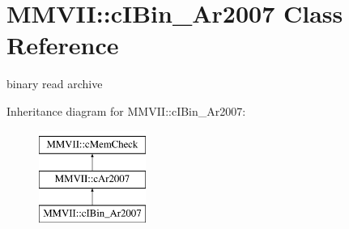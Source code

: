 \hypertarget{classMMVII_1_1cIBin__Ar2007}{}\section{M\+M\+V\+II\+:\+:c\+I\+Bin\+\_\+\+Ar2007 Class Reference}
\label{classMMVII_1_1cIBin__Ar2007}


binary read archive  


Inheritance diagram for M\+M\+V\+II\+:\+:c\+I\+Bin\+\_\+\+Ar2007\+:\begin{figure}[H]
\begin{center}
\leavevmode
\includegraphics[height=3.000000cm]{classMMVII_1_1cIBin__Ar2007}
\end{center}
\end{figure}

